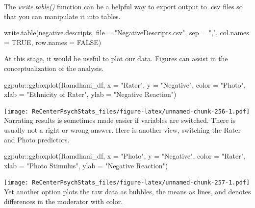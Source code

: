 \documentclass[
  11pt,
]{book}
\newenvironment{Shaded}{\begin{snugshade}}{\end{snugshade}}
\newcommand{\AttributeTok}[1]{\textcolor[rgb]{0.77,0.63,0.00}{#1}}
\newcommand{\ConstantTok}[1]{\textcolor[rgb]{0.00,0.00,0.00}{#1}}
\newcommand{\FunctionTok}[1]{\textcolor[rgb]{0.00,0.00,0.00}{#1}}
\newcommand{\NormalTok}[1]{#1}
\newcommand{\SpecialCharTok}[1]{\textcolor[rgb]{0.00,0.00,0.00}{#1}}
\newcommand{\StringTok}[1]{\textcolor[rgb]{0.31,0.60,0.02}{#1}}
\begin{document}
The \emph{write.table()} function can be a helpful way to export output to .csv files so that you can manipulate it into tables.

\begin{Shaded}
\begin{Highlighting}[]
\FunctionTok{write.table}\NormalTok{(negative.descripts, }\AttributeTok{file =} \StringTok{"NegativeDescripts.csv"}\NormalTok{, }\AttributeTok{sep =} \StringTok{","}\NormalTok{,}
    \AttributeTok{col.names =} \ConstantTok{TRUE}\NormalTok{, }\AttributeTok{row.names =} \ConstantTok{FALSE}\NormalTok{)}
\end{Highlighting}
\end{Shaded}

At this stage, it would be useful to plot our data. Figures can assist in the conceptualization of the analysis.

\begin{Shaded}
\begin{Highlighting}[]
\NormalTok{ggpubr}\SpecialCharTok{::}\FunctionTok{ggboxplot}\NormalTok{(Ramdhani\_df, }\AttributeTok{x =} \StringTok{"Rater"}\NormalTok{, }\AttributeTok{y =} \StringTok{"Negative"}\NormalTok{, }\AttributeTok{color =} \StringTok{"Photo"}\NormalTok{,}
    \AttributeTok{xlab =} \StringTok{"Ethnicity of Rater"}\NormalTok{, }\AttributeTok{ylab =} \StringTok{"Negative Reaction"}\NormalTok{)}
\end{Highlighting}
\end{Shaded}

\texttt{[image: ReCenterPsychStats\_files/figure-latex/unnamed-chunk-256-1.pdf]}
Narrating results is sometimes made easier if variables are switched. There is usually not a right or wrong answer. Here is another view, switching the Rater and Photo predictors.

\begin{Shaded}
\begin{Highlighting}[]
\NormalTok{ggpubr}\SpecialCharTok{::}\FunctionTok{ggboxplot}\NormalTok{(Ramdhani\_df, }\AttributeTok{x =} \StringTok{"Photo"}\NormalTok{, }\AttributeTok{y =} \StringTok{"Negative"}\NormalTok{, }\AttributeTok{color =} \StringTok{"Rater"}\NormalTok{,}
    \AttributeTok{xlab =} \StringTok{"Photo Stimulus"}\NormalTok{, }\AttributeTok{ylab =} \StringTok{"Negative Reaction"}\NormalTok{)}
\end{Highlighting}
\end{Shaded}

\texttt{[image: ReCenterPsychStats\_files/figure-latex/unnamed-chunk-257-1.pdf]}
Yet another option plots the raw data as bubbles, the means as lines, and denotes differences in the moderator with color.
\end{document}
